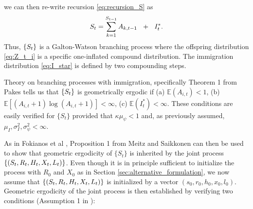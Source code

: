 \documentclass{article}
\begin{document}
we can then re-write recursion \eqref{eq:recursion_S} as
$$
S_t = \sum_{k = 1}^{S_{t - 1}} A_{k, t - 1} \ \ + \ \ I^*_t.
$$
Thus, $\{S_t\}$ is a Galton-Watson branching process where the offspring distribution \eqref{eq:Z_t_i} is a specific one-inflated compound distribution. %
The immigration distribution \eqref{eq:I_star} is defined by two compounding steps. %

Theory on branching processes with immigration, specifically Theorem 1 from Pakes \cite{Pakes1971} tells us that $\{S_t\}$ is geometrically ergodic if (a) $\mathbb{E}(A_{i, t}) < 1$, (b) $\mathbb{E}[(A_{i, t} + 1)\log(A_{i, t} + 1)] < \infty$, (c) $\mathbb{E}(I^*_t) < \infty$. These conditions are easily verified for $\{S_t\}$ provided that $\kappa\mu_\psi < 1$ and, as previously assumed, $\mu_I, \sigma^2_I, \sigma^2_\psi < \infty$.


As in Fokianos et al \cite{Fokianos2009}, Proposition 1 from Meitz and Saikkonen \cite{Meitz2008} can then be used to show that geometric ergodicity of $\{S_t\}$ is inherited by the joint process $\{(S_t, R_t, H_t, X_t, L_t)\}$. %
Even though it is in principle sufficient to initialize the process with $R_0$ and $X_0$ as in Section \ref{sec:alternative_formulation}, we now assume that $\{(S_t, R_t, H_t, X_t, L_t)\}$ is initialized by a vector $(s_0, r_0, h_0, x_0, l_0)$. Geometric ergodicity of the joint process is then established by verifying two conditions (Assumption 1 in \cite{Meitz2008}):
\end{document}
